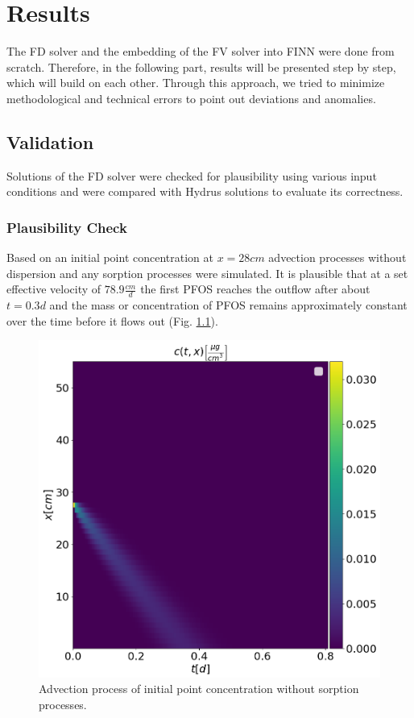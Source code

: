 \chapter{Results}
The FD solver and the embedding of the FV solver into FINN were done from scratch. Therefore, in the following part, results will be presented step by step, which will build on each other. Through this approach, we tried to minimize methodological and technical errors to point out deviations and anomalies.
\section{Validation}
Solutions of the FD solver were checked for plausibility using various input conditions and were compared with Hydrus solutions to evaluate its correctness.
\subsection{Plausibility Check}
Based on an initial point concentration at $x=28 cm$ advection processes without dispersion and any sorption processes were simulated. It is plausible that at a set effective velocity of $78.9 \frac{cm}{d}$ the first PFOS reaches the outflow after about $t = 0.3d$ and the mass or concentration of PFOS remains approximately constant over the time before it flows out (Fig. \ref{fig:sol_basic_adv}).
\begin{figure}[h!]
	\centering
	\includegraphics[scale=0.55]{images/sol_basic_adv.png}
\caption[Plausibility check: Advection]{Advection process of initial point concentration without sorption processes.}
\label{fig:sol_basic_adv}
\end{figure}
